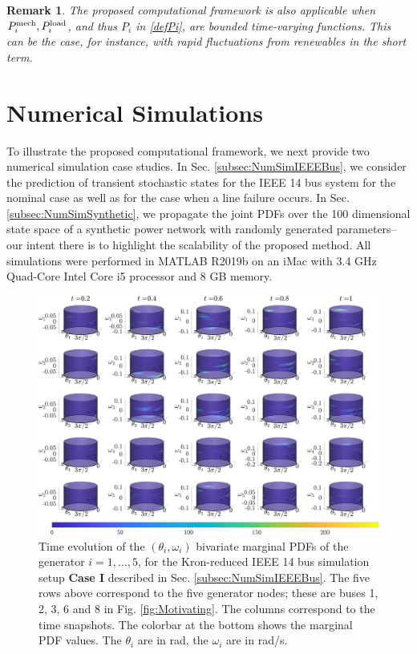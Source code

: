 \documentclass[10pt,twocolumn]{IEEEtran}
\newtheorem{remark}{Remark}
\newcommand{\blue}{\color{blue}}
\begin{document}
\begin{remark}\label{remark:timevaryingEffectivePowerInput}
The proposed computational framework is also applicable when $P_{i}^{\rm{mech}}, P_{i}^{\rm{load}}$, and thus $P_{i}$ in \eqref{defPi}, are bounded time-varying functions. This can be the case, for instance, with rapid fluctuations from renewables {\blue{or from loads}} in the short term.
\end{remark}




\section{Numerical Simulations}\label{sec:NumericalSimulations}
To illustrate the proposed computational framework, we next provide two numerical simulation case studies. In Sec. \ref{subsec:NumSimIEEEBus}, we consider the prediction of transient stochastic states for the IEEE 14 bus system for the nominal case as well as for the case when a line failure occurs. In Sec. \ref{subsec:NumSimSynthetic}, we propagate the joint PDFs over the 100 dimensional state space of a synthetic power network with randomly generated parameters--our intent there is to highlight the scalability of the proposed method. All simulations were performed in MATLAB R2019b on an iMac with 3.4 GHz Quad-Core Intel Core i5 processor and 8 GB memory. 



\begin{figure}[t]
\centering
\includegraphics[width=0.9\linewidth]{IEEE14marginalsCase0.png}
\caption{\small{Time evolution of the $(\theta_{i},\omega_{i})$ bivariate marginal PDFs of the generator $i=1,\hdots,5$, for the Kron-reduced IEEE 14 bus simulation setup \textbf{Case I} described in Sec. \ref{subsec:NumSimIEEEBus}. The five rows above correspond to the five generator nodes; these are buses 1, 2, 3, 6 and 8 in Fig. \ref{fig:Motivating}. The columns correspond to the time snapshots. The colorbar at the bottom shows the marginal PDF values. The $\theta_i$ are in rad, the $\omega_i$ are in rad/s.}}
\vspace*{-0.1in}
\label{fig:IEEE14marginalsCase0}
\end{figure}
\end{document}
